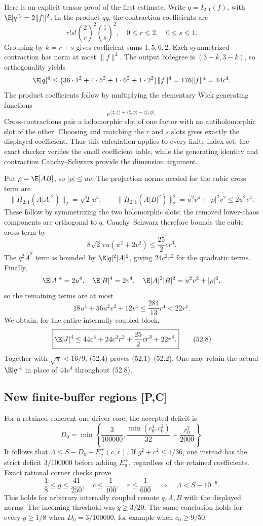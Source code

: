 Here is an explicit tensor proof of the first estimate. Write
\(q=I_{2,1}(f)\), with \(\E|q|^2=2\|f\|^2\).
In the product \(q\bar q\), the contraction coefficients are
\[
 r!s!\binom2r^2\binom1s^2,\quad
 0\le r\le2,\quad0\le s\le1.
\]
Grouping by \(k=r+s\) gives coefficient sums \(1,5,6,2\).
Each symmetrized contraction has norm at most \(\|f\|^2\).
The output bidegree is \((3-k,3-k)\), so orthogonality yields
\[
 \E|q|^4\le
 \bigl(36\cdot1^2+4\cdot5^2+1\cdot6^2+1\cdot2^2\bigr)\|f\|^4
 =176\|f\|^4=44c^4.
\]
The product coefficients follow by multiplying the elementary Wick
generating functions
\[
 e^{\langle z,\xi\rangle+\langle\bar z,\eta\rangle-\langle\xi,\eta\rangle}.
\]
Cross-contractions pair a holomorphic slot of one factor with an
antiholomorphic slot of the other. Choosing and matching the \(r\)
and \(s\) slots gives exactly the displayed coefficient.
Thus this calculation applies to every finite index set; the exact
checker verifies the small coefficient table, while the generating
identity and contraction Cauchy--Schwarz provide the dimension argument.

Put \(\rho=\E[AB]\), so \(|\rho|\le uv\).
The projection norms needed for the cubic cross term are
\[
 \|\Pi_{2,1}(A|A|^2)\|_2=\sqrt2\,u^3,\qquad
 \|\Pi_{2,1}(A|B|^2)\|_2^2=u^2v^4+|\rho|^2v^2
 \le2u^2v^4.
 \tag{52.7}
\]
These follow by symmetrizing the two holomorphic slots; the removed
lower-chaos components are orthogonal to \(q\).
Cauchy--Schwarz therefore bounds the cubic cross term by
\[
 8\sqrt2\,cu(u^2+2v^2)\le\frac{25}{2}cr^3.
\]
The \(q^2\bar A^2\) term is bounded by
\(\E|q|^2|A|^2\), giving \(24c^2r^2\) for the quadratic terms.
Finally,
\[
 \E|A|^4=2u^4,\quad \E|B|^4=2v^4,\quad
 \E|A|^2|B|^2=u^2v^2+|\rho|^2,
\]
so the remaining terms are at most
\[
 18u^4+56u^2v^2+12v^4
 \le\frac{284}{13}r^4<22r^4.
\]
We obtain, for the entire internally coupled block,
\[
 \boxed{\E|J|^4\le44c^4+24c^2r^2+\frac{25}{2}cr^3+22r^4.}
 \tag{52.8}
\]
Together with \(\sqrt\pi<16/9\), (52.4) proves (52.1)--(52.2).
One may retain the actual \(\E|q|^4\) in place of \(44c^4\)
throughout (52.8).

\subsection{New finite-buffer regions [P,C]}
For a retained coherent one-driver core, the accepted deficit is
\[
 D_0=\min\left\{\frac3{100000},
 \frac{\min(c_0^4,c_0^2)}{32}+\frac{r_0^2}{2000}\right\}.
\]
It follows that \(\Lambda\le S-D_0+E_g^+(c,r)\).
If \(g^2+c^2\le1/36\), one instead has the strict deficit \(3/100000\)
before adding \(E_g^+\), regardless of the retained coefficients.
Exact rational corner checks prove
\[
 \boxed{\frac18\le g\le\frac{41}{250},\quad
 c\le\frac1{100},\quad r\le\frac1{600}
 \quad\Longrightarrow\quad \Lambda<S-10^{-6}.}
 \tag{52.9}
\]
This holds for arbitrary internally coupled remote \(q,A,B\)
with the displayed norms. The incoming threshold was \(g\ge3/20\).
The same conclusion holds for every \(g\ge1/8\) when
\(D_0=3/100000\), for example when \(c_0\ge9/50\).

